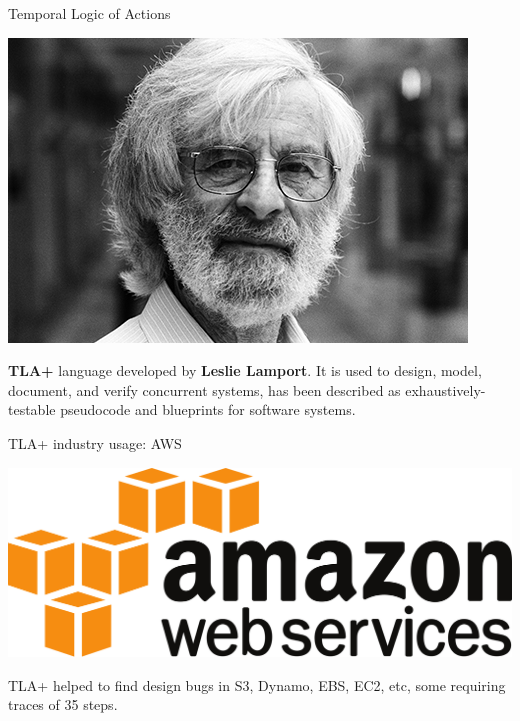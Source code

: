 \documentclass[12pt]{beamer}
\begin{document}
  \begin{frame}{Temporal Logic of Actions}
      \begin{center}
          \includegraphics[scale=0.3]{figures/lamport.jpg}
      \end{center}
      \textbf{TLA+} language developed by \textbf{Leslie Lamport}. It is
      used to design, model, document, and verify concurrent systems, has
      been described as exhaustively-testable pseudocode and blueprints
      for software systems.
  \end{frame}
  \begin{frame}{TLA+ industry usage: AWS}
    \begin{center}
       \includegraphics[scale=0.08]{figures/aws}
    \end{center}
     TLA+ helped to find design bugs in S3, Dynamo, EBS, EC2, etc, some
     requiring traces of 35 steps. \cite{aws2014}
  \end{frame}
\end{document}
